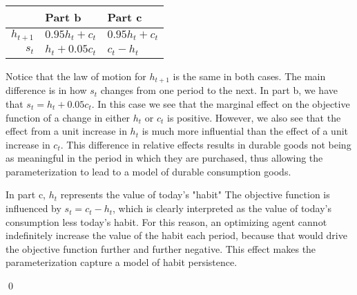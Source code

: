 \begin{homeworkProblem}[Problem 5.4]
{\begin{enumerate}[a.]
          \begin{center}
          \begin{tabular}{r| l l}
            & Part b & Part c \\
            \hline
            $h_{t+1}$ & $0.95 h_t + c_t$ & $0.95 h_t + c_t$\\
            $s_t$ & $h_t + 0.05 c_t$ & $c_t - h_t$
          \end{tabular}
          \end{center}

          Notice that the law of motion for $h_{t+1}$ is the same in both cases. The main difference is in how $s_t$ changes from one period to the next. In part b, we have that $s_t = h_t + 0.05c_t$. In this case we see that the marginal effect on the objective function of a change in either $h_t$ or $c_t$ is positive. However, we also see that the effect from a unit increase in $h_t$ is much more influential than the effect of a unit increase in $c_t$. This difference in relative effects results in durable goods not being as meaningful in the period in which they are purchased, thus allowing the parameterization to lead to a model of durable consumption goods.

          In part c, $h_t$ represents the value of today's "habit" The objective function is influenced by $s_t = c_t - h_t$, which is clearly interpreted as the value of today's consumption less today's habit. For this reason, an optimizing agent cannot indefinitely increase the value of the habit each period, because that would drive the objective function further and further negative. This effect makes the parameterization capture a model of habit persistence.

    \end{enumerate}

    
    \qed

  }
\end{homeworkProblem}

